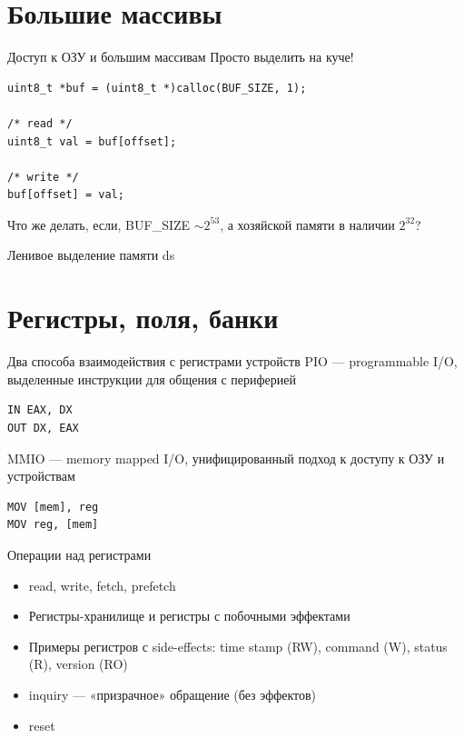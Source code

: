 \documentclass{beamer}
\begin{document}
\section{Большие массивы}

\begin{frame}[fragile]{Доступ к ОЗУ и большим массивам}
Просто выделить на куче!
\begin{verbatim}
uint8_t *buf = (uint8_t *)calloc(BUF_SIZE, 1);

/* read */
uint8_t val = buf[offset];

/* write */
buf[offset] = val;
\end{verbatim}
\pause
Что же делать, если, BUF_SIZE $\sim 2^{53}$, а хозяйской памяти в наличии $2^{32}$?
\end{frame}

\begin{frame}[fragile]{Ленивое выделение памяти}
ds
\end{frame}

\section{Регистры, поля, банки}

\begin{frame}[fragile]{Два способа взаимодействия с регистрами устройств}
PIO --- programmable I/O, выделенные инструкции для общения с периферией

\begin{verbatim}
IN EAX, DX
OUT DX, EAX
\end{verbatim}
\pause

MMIO --- memory mapped I/O, унифицированный подход к доступу к ОЗУ и устройствам

\begin{verbatim}
MOV [mem], reg
MOV reg, [mem]
\end{verbatim}

\end{frame}


\begin{frame}{Операции над регистрами}
\begin{itemize}
\item read, write, fetch, prefetch
\item Регистры-хранилище и регистры с побочными эффектами
\item Примеры регистров с side-effects: time stamp (RW), command (W), status (R), version (RO)
\item inquiry --- «призрачное» обращение (без эффектов)
\item reset
\end{itemize}

\end{frame}
\end{document}
